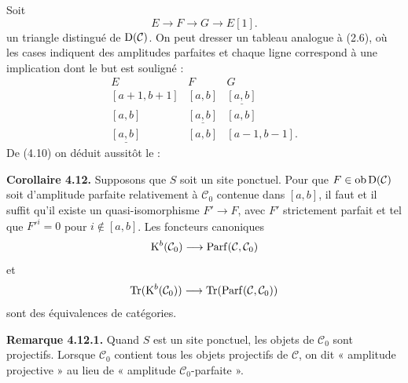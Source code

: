 \documentclass[11pt]{article}
\newcommand{\Parf}{\operatorname{Parf}}
\begin{document}
Soit
\[
  E\longrightarrow F\longrightarrow G\longrightarrow E[1].
\]
un triangle distingué de \(\Dpx(\mathcal C)\). On peut dresser un tableau analogue à (2.6), où les cases indiquent des amplitudes parfaites et chaque ligne correspond à une implication dont le but est souligné :
\[
\begin{array}{ccc}
E&F&G\\[0.3em]
{}[a+1,b+1]&{}[a,b]&\underline{[a,b]}\\
{}[a,b]&\underline{[a,b]}&{}[a,b]\\
\underline{[a,b]}&{}[a,b]&{}[a-1,b-1].
\end{array}
\]
De (4.10) on déduit aussitôt le :

\textbf{Corollaire 4.12.} Supposons que \(S\) soit un site ponctuel. Pour que \(F\in\Ob\Dpx(\mathcal C)\) soit d'amplitude parfaite relativement à \(\mathcal C_0\) contenue dans \([a,b]\), il faut et il suffit qu'il existe un quasi-isomorphisme \(F'\to F\), avec \(F'\) strictement parfait et tel que \(F'^i=0\) pour \(i\notin[a,b]\). Les foncteurs canoniques
\[
  \Kpx^b(\mathcal C_0)\longrightarrow\Parf(\mathcal C,\mathcal C_0)
\]
et
\[
  \Tr(\Kpx^b(\mathcal C_0))\longrightarrow\Tr(\Parf(\mathcal C,\mathcal C_0))
\]
sont des équivalences de catégories.

\textbf{Remarque 4.12.1.} Quand \(S\) est un site ponctuel, les objets de \(\mathcal C_0\) sont projectifs. Lorsque \(\mathcal C_0\) contient tous les objets projectifs de \(\mathcal C\), on dit « amplitude projective » au lieu de « amplitude \(\mathcal C_0\)-parfaite ».



\providecommand{\Cpx}{\mathrm C}
\providecommand{\Kpx}{\mathrm K}
\providecommand{\Dpx}{\mathrm D}
\providecommand{\Ho}{\mathrm H}
\providecommand{\RHom}{\mathrm R\!\operatorname{Hom}}
\providecommand{\Ob}{\operatorname{ob}}
\providecommand{\qis}{\xrightarrow{\sim}}
\providecommand{\RHom}{\mathrm R\!\Hom}
\providecommand{\Ext}{\operatorname{Ext}}
\providecommand{\Hom}{\operatorname{Hom}}
\providecommand{\Tr}{\operatorname{Tr}}

\providecommand{\Add}{\operatorname{Add}}
\providecommand{\Cart}{\operatorname{Cart}}
\providecommand{\perfamp}{\operatorname{perf.amp}}
\providecommand{\perfdim}{\operatorname{perf.dim}}
\providecommand{\toramp}{\operatorname{tor.amp}}
\providecommand{\torf}{\operatorname{torf}}
\providecommand{\injf}{\operatorname{injf}}
\providecommand{\rg}{\operatorname{rg}}
\providecommand{\is}{\mathrm{is}}
\providecommand{\Mod}{\operatorname{Mod}}
\end{document}
